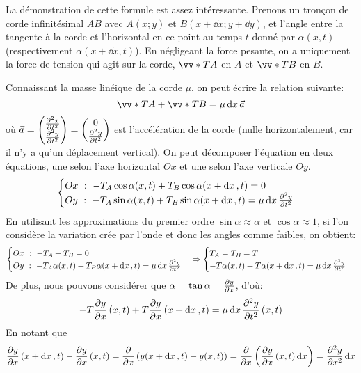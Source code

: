 \documentclass[11pt]{article}
\begin{document}
    La démonstration de cette formule est assez intéressante.
    Prenons un tronçon de corde infinitésimal $AB$ avec $A(x;y)$ et $B(x+\dd{x};y+\dd{y})$, et l'angle entre la tangente
    à la corde et l'horizontal en ce point au temps $t$ donné par $\alpha (x,t)$ (respectivement $\alpha (x+\dd{x},t)$).
    En négligeant la force pesante, on a uniquement la force de tension qui agit sur la corde, $\vv*{T}{A}$ en $A$
    et $\vv*{T}{B}$ en $B$.
    
    Connaissant la masse linéique de la corde $\mu$, on peut écrire la relation suivante:
    \[
        \vv*{T}{A} + \vv*{T}{B} = \mu \dd{x} \vec{a}
    \]
    où $\vec{a} = \mqty(\pdv[2]{x}{t} \\ \pdv[2]{y}{t}) = \mqty(0 \\ \pdv[2]{y}{t}) $ est l'accélération de la corde
    (nulle horizontalement, car il n'y a qu'un déplacement vertical).
    On peut décomposer l'équation en deux équations, une selon l'axe horizontal $Ox$ et une selon l'axe verticale $Oy$.
    \[
        \begin{cases}
            Ox \ : \ - T_A \cos \alpha (x,t) + T_B \cos \alpha (x+\dd{x},t) = 0 \\
            Oy \ : \ - T_A \sin \alpha (x,t) + T_B \sin \alpha (x+\dd{x},t) = \mu \dd{x} \pdv[2]{y}{t}
        \end{cases}
    \]
    En utilisant les approximations du premier ordre $\sin \alpha \approx \alpha$ et $\cos \alpha \approx 1$, si l'on
    considère la variation crée par l'onde et donc les angles comme faibles, on obtient:
    \[
        \begin{cases}
            Ox \ : \ - T_A + T_B = 0 \\
            Oy \ : \ - T_A \alpha (x,t) + T_B \alpha (x+\dd{x},t) = \mu \dd{x} \pdv[2]{y}{t}
        \end{cases}
        \Rightarrow
        \begin{cases}
            T_A = T_B = T \\
            - T \alpha (x,t) + T \alpha (x+\dd{x},t) = \mu \dd{x} \pdv[2]{y}{t}
        \end{cases}
    \]
    De plus, nous pouvons considérer que $\alpha = \tan \alpha = \pdv{y}{x}$, d'où:
    \[
        -T \pdv{y}{x} \left( x,t \right) + T \pdv{y}{x} \left( x+\dd{x},t \right) = \mu \dd{x} \pdv[2]{y}{t} \left( x,t \right)
    \]
    En notant que
    \[
        \pdv{y}{x} \left( x+\dd{x},t \right) - \pdv{y}{x} \left( x,t \right) =
        \pdv{x} \left( y(x+\dd{x},t) - y(x,t) \right) = \pdv{x} \left(  \pdv{y}{x} \left( x,t \right) \dd{x} \right) =
        \pdv[2]{y}{x} \dd{x}
    \]
\end{document}

